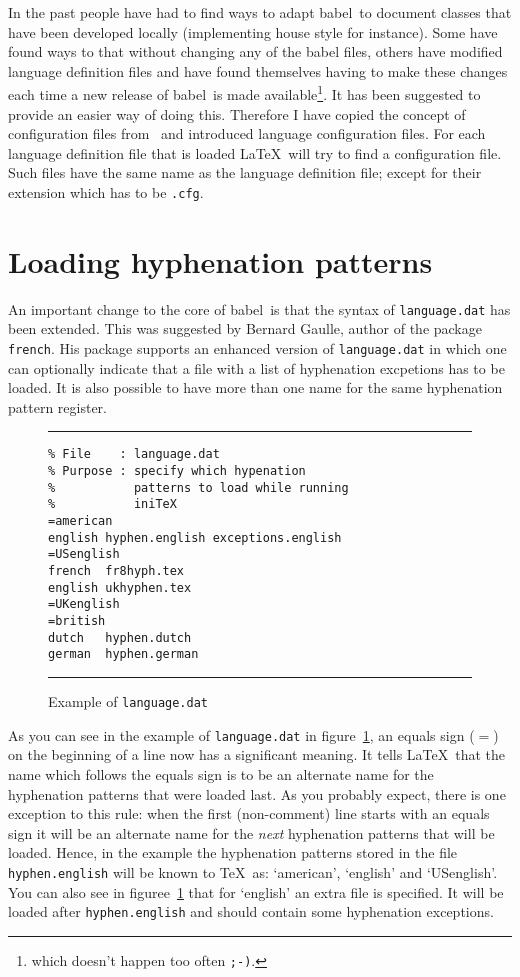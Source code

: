 \documentclass{ltugboat}
\newcommand\figrule{\kern3pt\hrule\kern3pt}
\newcommand*{\file}[1]{\texttt{#1}}
\newcommand*{\pkg}[1]{\texttt{#1}}
\newcommand*\babel{\textsf{babel}}
\begin{document}
In the past people have had to find ways to adapt \babel\ to document
classes that have been developed locally (implementing house style for
instance). Some have found ways to that without changing any of the
babel files, others have modified language definition files and have
found themselves having to make these changes each time a new release
of \babel\ is made available\footnote{which doesn't happen too often
  \texttt{;-)}.}. It has been suggested to provide an easier way of
doing this. Therefore I have copied the concept of configuration files
from \LaTeXe\ and introduced language configuration files. For each
language definition file that is loaded \LaTeX\ will try to find a
configuration file. Such files have the same name as the language
definition file; except for their extension which has to be
\file{.cfg}.

\section{Loading hyphenation patterns}

An important change to the core of \babel\ is that the syntax of
\file{language.dat} has been extended. This was suggested by Bernard
Gaulle, author of the package \pkg{french}. His package supports an
enhanced version of \file{language.dat} in which one can optionally
indicate that a file with a list of hyphenation excpetions has to be
loaded. It is also possible to have more than one name for the same
hyphenation pattern register.

\begin{figure}[ht]
  \figrule
\begin{verbatim}
% File    : language.dat
% Purpose : specify which hypenation 
%           patterns to load while running
%           iniTeX 
=american
english hyphen.english exceptions.english
=USenglish
french  fr8hyph.tex
english ukhyphen.tex
=UKenglish
=british
dutch   hyphen.dutch
german  hyphen.german 
\end{verbatim}
  \figrule
  \caption{Example of \file{language.dat}}\label{fig:l.d}
\end{figure}

As you can see in the example of \file{language.dat} in
figure~\ref{fig:l.d}, an equals sign ($=$) on the beginning of a line
now has a significant meaning. It tells \LaTeX\ that the name which
follows the equals sign is to be an alternate name for the hyphenation
patterns that were loaded last. As you probably expect, there is one
exception to this rule: when the first (non-comment) line starts with
an equals sign it will be an alternate name for the \emph{next}
hyphenation patterns that will be loaded. Hence, in the example the
hyphenation patterns stored in the file \file{hyphen.english} will be
known to \TeX\ as: `american', `english' and `USenglish'. You can also
see in figuree~\ref{fig:l.d} that for `english' an extra file is
specified. It will be loaded after \file{hyphen.english} and should
contain some hyphenation exceptions.
\end{document}
